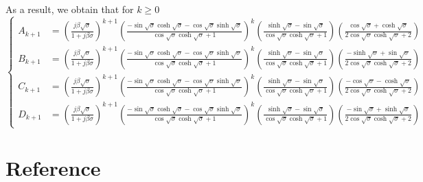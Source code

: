 \documentclass{article}
\begin{document}
As a result, we obtain that for $k \geq 0$
\scriptsize
\begin{equation}
    \left\{\begin{aligned}
        A_{k+1} &= \left( \frac{j \beta \sqrt{\sigma }}{1+j \beta \sigma } \right)^{k+1} \left( \frac{ -\sin\sqrt{\sigma} \cosh\sqrt{\sigma} - \cos\sqrt{\sigma} \sinh\sqrt{\sigma} }{ \cos\sqrt{\sigma }\cosh\sqrt{\sigma }+1 } \right)^k \left( \frac{\sinh\sqrt{\sigma }-\sin\sqrt{\sigma }}{\cos\sqrt{\sigma } \cosh\sqrt{\sigma }+1} \right) \left(\frac{\cos\sqrt{\sigma }+\cosh\sqrt{\sigma }}{2 \cos\sqrt{\sigma }\cosh\sqrt{\sigma }+2} \right) \\
        B_{k+1} &= \left( \frac{j \beta \sqrt{\sigma }}{1+j \beta \sigma } \right)^{k+1}  \left( \frac{ -\sin\sqrt{\sigma} \cosh\sqrt{\sigma} - \cos\sqrt{\sigma} \sinh\sqrt{\sigma} }{ \cos\sqrt{\sigma }\cosh\sqrt{\sigma }+1 } \right)^k \left( \frac{\sinh\sqrt{\sigma }-\sin\sqrt{\sigma }}{\cos\sqrt{\sigma } \cosh\sqrt{\sigma }+1} \right) \left( \frac{-\sinh\sqrt{\sigma }+\sin\sqrt{\sigma }}{2 \cos\sqrt{\sigma }\cosh\sqrt{\sigma }+2} \right) \\
        C_{k+1} &= \left( \frac{j \beta \sqrt{\sigma }}{1+j \beta \sigma } \right)^{k+1}  \left( \frac{ -\sin\sqrt{\sigma} \cosh\sqrt{\sigma} - \cos\sqrt{\sigma} \sinh\sqrt{\sigma} }{ \cos\sqrt{\sigma }\cosh\sqrt{\sigma }+1 } \right)^k \left( \frac{\sinh\sqrt{\sigma }-\sin\sqrt{\sigma }}{\cos\sqrt{\sigma } \cosh\sqrt{\sigma }+1} \right) \left( \frac{-\cos\sqrt{\sigma }-\cosh\sqrt{\sigma }}{2 \cos\sqrt{\sigma } \cosh\sqrt{\sigma }+2} \right) \\
        D_{k+1} &= \left( \frac{j \beta \sqrt{\sigma }}{1+j \beta \sigma } \right)^{k+1} \left( \frac{ -\sin\sqrt{\sigma} \cosh\sqrt{\sigma} - \cos\sqrt{\sigma} \sinh\sqrt{\sigma} }{ \cos\sqrt{\sigma }\cosh\sqrt{\sigma }+1 } \right)^k \left( \frac{\sinh\sqrt{\sigma }-\sin\sqrt{\sigma }}{\cos\sqrt{\sigma } \cosh\sqrt{\sigma }+1} \right) \left( \frac{-\sin\sqrt{\sigma }+\sinh\sqrt{\sigma }}{2 \cos\sqrt{\sigma }\cosh\sqrt{\sigma }+2} \right)
    \end{aligned}\right.
\end{equation}
\normalsize























































\section*{Reference}



\end{document}
